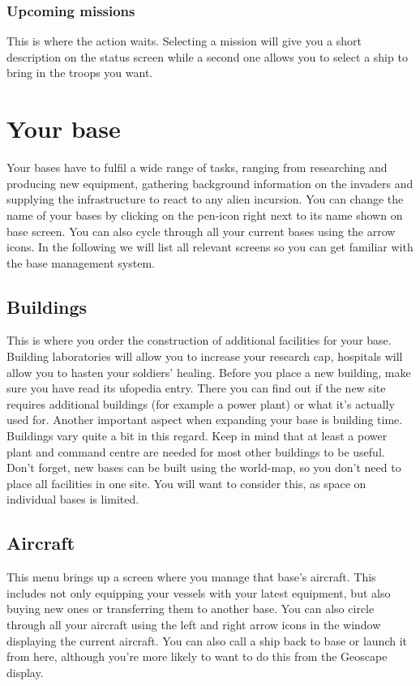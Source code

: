 \subsubsection{Upcoming missions}
This is where the action waits. Selecting a mission will give you a short description on the status screen while a second one allows you to select a ship to bring in the troops you want.

\section{Your base}
Your bases have to fulfil a wide range of tasks, ranging from researching and producing new equipment, gathering background information on the invaders and supplying the infrastructure to react to any alien incursion. You can change the name of your bases by clicking on the pen-icon right next to its name shown on base screen. You can also cycle through all your current bases using the arrow icons. In the following we will list all relevant screens so you can get familiar with the base management system.

\subsection{Buildings}
This is where you order the construction of additional facilities for your base.  Building laboratories will allow you to increase your research cap, hospitals will allow you to hasten your soldiers' healing.
Before you place a new building, make sure you have read its ufopedia entry. There you can find out if the new site requires additional buildings (for example a power plant) or what it's actually used for. Another important aspect when expanding your base is building time. Buildings vary quite a bit in this regard. Keep in mind that at least a power plant and command centre are needed for most other buildings to be useful. Don't forget, new bases can be built using the world-map, so you don't need to place all facilities in one site. You will want to consider this, as space on individual bases is limited.

\subsection{Aircraft}
This menu brings up a screen where you manage that base's aircraft. This includes not only equipping your vessels with your latest equipment, but also buying new ones or transferring them to another base. You can also circle through all your aircraft using the left and right arrow icons in the window displaying the current aircraft. You can also call a ship back to base or launch it from here, although you're more likely to want to do this from the Geoscape display.

